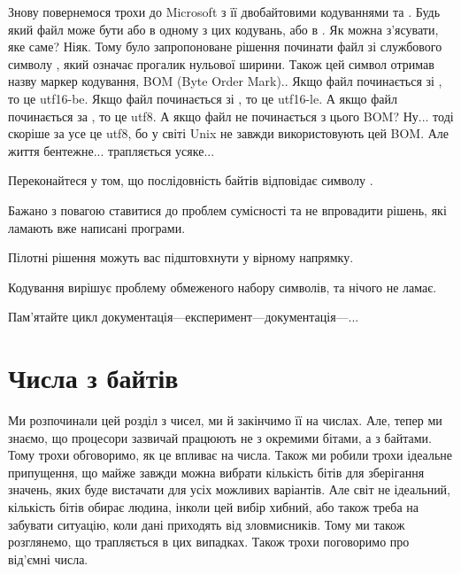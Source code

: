 Знову повернемося трохи до Microsoft з її двобайтовими кодуваннями  та .
Будь який файл може бути або в одному з цих кодувань, або в .
Як можна з'ясувати, яке саме? Ніяк.
Тому було запропоноване рішення починати файл зі службового символу , який означає прогалик нульової ширини.
Також цей символ отримав назву маркер кодування, BOM (Byte Order Mark)..
Якщо файл починається зі , то це utf16-be.
Якщо файл починається зі , то це utf16-le.
А якщо файл починається за , то це utf8.
А якщо файл не починається з цього BOM?
Ну... тоді скоріше за усе це utf8, бо у світі Unix не завжди використовують цей BOM.
Але життя бентежне... трапляється усяке...

\begin{exercise}
Переконайтеся у том, що послідовність байтів  відповідає символу .
\end{exercise}

\begin{summary}
\item Бажано з повагою ставитися до проблем сумісності та не впровадити рішень, які ламають вже написані програми.
\item Пілотні рішення можуть вас підштовхнути у вірному напрямку.
\item Кодування  вирішує проблему обмеженого набору символів, та нічого не ламає.
\item Пам'ятайте цикл документація---експеримент---документація---...
\end{summary}

\section{Числа з байтів}

Ми розпочинали цей розділ з чисел, ми й закінчимо її на числах.
Але, тепер ми знаємо, що процесори зазвичай працюють не з окремими бітами, а з байтами.
Тому трохи обговоримо, як це впливає на числа.
Також ми робили трохи ідеальне припущення, що майже завжди можна вибрати кількість бітів для зберігання значень, яких буде вистачати для усіх можливих варіантів.
Але світ не ідеальний, кількість бітів обирає людина, інколи цей вибір хибний, або також треба на забувати ситуацію, коли дані приходять від зловмисників.
Тому ми також розглянемо, що трапляється в цих випадках.
Також трохи поговоримо про від'ємні числа.

